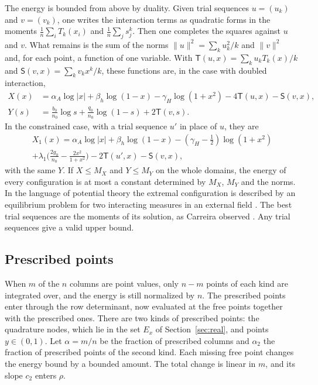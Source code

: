 \documentclass[11pt]{amsart}
\theoremstyle{definition}
\theoremstyle{remark}
\numberwithin{equation}{section}
\begin{document}
The energy is bounded from above by duality. Given trial sequences $u=(u_k)$ and $v=(v_k)$, one writes the
interaction terms as quadratic forms in the moments $\frac1n\sum_iT_k(x_i)$ and $\frac1n\sum_js_j^k$. Then one
completes the squares against $u$ and $v$. What remains is the sum of the norms $\|u\|^2=\sum_ku_k^2/k$ and
$\|v\|^2$ and, for each point, a function of one variable. With $\mathsf T(u,x)=\sum_ku_kT_k(x)/k$ and
$\mathsf S(v,x)=\sum_kv_kx^k/k$, these functions are, in the case with doubled interaction,
\begin{align*}
 X(x)&=\alpha_A\log|x|+\beta_h\log(1-x)-\gamma_H\log(1+x^2)-4\mathsf T(u,x)-\mathsf S(v,x),\\
 Y(s)&=\tfrac{b_0}{n_0}\log s+\tfrac{q_0}{n_0}\log(1-s)+2\mathsf T(v,s).
\end{align*}
In the constrained case, with a trial sequence $u'$ in place of $u$, they are
\begin{multline*}
 X_1(x)=\alpha_A\log|x|+\beta_h\log(1-x)-(\gamma_H-\tfrac12)\log(1+x^2)\\
 +\lambda_1\bigl(\tfrac{2g_0}{n_0}-\tfrac{2x^2}{1+x^2}\bigr)-2\mathsf T(u',x)-\mathsf S(v,x),
\end{multline*}
with the same $Y$. If $X\le M_X$ and $Y\le M_Y$ on the whole domains, the energy of every configuration is at
most a constant determined by $M_X$, $M_Y$ and the norms. In the language of potential theory the extremal
configuration is described by an equilibrium problem for two interacting measures in an external field
\cite{SaffTotik}. The best trial sequences are the moments of its solution, as Carreira observed
\cite{Carreira2026}. Any trial sequences give a valid upper bound.

\subsection{Prescribed points}\label{ssec:prescribed}
When $m$ of the $n$ columns are point values, only $n-m$ points of each kind are integrated over, and the
energy is still normalized by $n$. The prescribed points enter through the row determinant, now evaluated
at the free points together with the prescribed ones. There are two kinds of prescribed points: the
quadrature nodes, which lie in the set $E_x$ of Section~\ref{sec:real}, and points $y\in(0,1)$. Let $\alpha=m/n$ be the fraction of
prescribed columns and $\alpha_2$ the fraction of prescribed points of the second kind. Each missing free point
changes the energy bound by a bounded amount. The total change is linear in $m$, and its slope $c_2$ enters
$\rho$.
\end{document}
